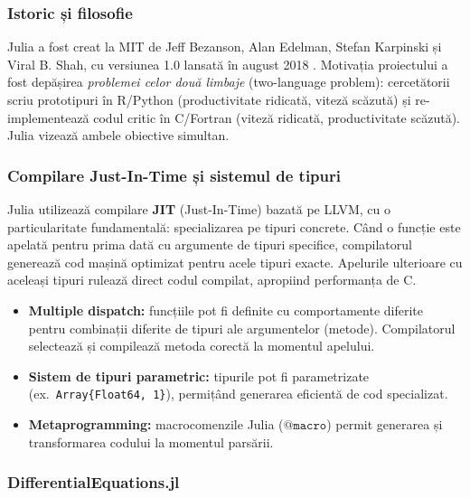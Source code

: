 \subsubsection{Istoric și filosofie}

Julia a fost creat la MIT de Jeff Bezanson, Alan Edelman, Stefan Karpinski
și Viral B. Shah, cu versiunea 1.0 lansată în august 2018 \cite{bezanson2017julia}.
Motivația proiectului a fost depășirea \emph{problemei celor două limbaje}
(two-language problem): cercetătorii scriu prototipuri în R/Python (productivitate
ridicată, viteză scăzută) și re-implementează codul critic în C/Fortran (viteză
ridicată, productivitate scăzută). Julia vizează ambele obiective simultan.

\subsubsection{Compilare Just-In-Time și sistemul de tipuri}

Julia utilizează compilare \textbf{JIT} (Just-In-Time) bazată pe LLVM, cu
o particularitate fundamentală: specializarea pe tipuri concrete. Când o funcție
este apelată pentru prima dată cu argumente de tipuri specifice, compilatorul
generează cod mașină optimizat pentru acele tipuri exacte. Apelurile ulterioare
cu aceleași tipuri rulează direct codul compilat, apropiind performanța de C.

\begin{itemize}
    \item \textbf{Multiple dispatch:} funcțiile pot fi definite cu comportamente
    diferite pentru combinații diferite de tipuri ale argumentelor (metode).
    Compilatorul selectează și compilează metoda corectă la momentul apelului.
    \item \textbf{Sistem de tipuri parametric:} tipurile pot fi parametrizate
    (ex.\ \texttt{Array\{Float64, 1\}}), permițând generarea eficientă de cod
    specializat.
    \item \textbf{Metaprogramming:} macrocomenzile Julia ($\texttt{@macro}$)
    permit generarea și transformarea codului la momentul parsării.
\end{itemize}

\subsubsection{DifferentialEquations.jl}

